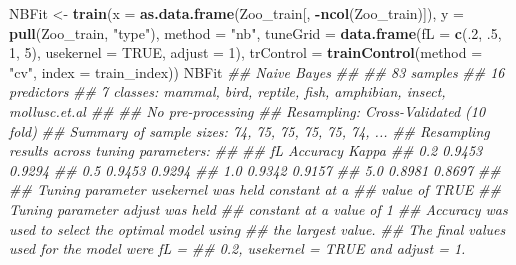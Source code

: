 \documentclass[
  notitlepage]{book}
\newenvironment{Shaded}{\begin{snugshade}}{\end{snugshade}}
\newcommand{\CommentTok}[1]{\textcolor[rgb]{0.56,0.35,0.01}{\textit{#1}}}
\newcommand{\DataTypeTok}[1]{\textcolor[rgb]{0.13,0.29,0.53}{#1}}
\newcommand{\DecValTok}[1]{\textcolor[rgb]{0.00,0.00,0.81}{#1}}
\newcommand{\FloatTok}[1]{\textcolor[rgb]{0.00,0.00,0.81}{#1}}
\newcommand{\KeywordTok}[1]{\textcolor[rgb]{0.13,0.29,0.53}{\textbf{#1}}}
\newcommand{\NormalTok}[1]{#1}
\newcommand{\OperatorTok}[1]{\textcolor[rgb]{0.81,0.36,0.00}{\textbf{#1}}}
\newcommand{\OtherTok}[1]{\textcolor[rgb]{0.56,0.35,0.01}{#1}}
\newcommand{\StringTok}[1]{\textcolor[rgb]{0.31,0.60,0.02}{#1}}
\begin{document}
\begin{Shaded}
\begin{Highlighting}[]
\NormalTok{NBFit \textless{}{-}}\StringTok{ }\KeywordTok{train}\NormalTok{(}\DataTypeTok{x =} \KeywordTok{as.data.frame}\NormalTok{(Zoo\_train[, }\OperatorTok{{-}}\KeywordTok{ncol}\NormalTok{(Zoo\_train)]), }
               \DataTypeTok{y =} \KeywordTok{pull}\NormalTok{(Zoo\_train, }\StringTok{"type"}\NormalTok{),}
               \DataTypeTok{method =} \StringTok{"nb"}\NormalTok{,}
               \DataTypeTok{tuneGrid =} \KeywordTok{data.frame}\NormalTok{(}\DataTypeTok{fL =} \KeywordTok{c}\NormalTok{(.}\DecValTok{2}\NormalTok{, }\FloatTok{.5}\NormalTok{, }\DecValTok{1}\NormalTok{, }\DecValTok{5}\NormalTok{), }
                                     \DataTypeTok{usekernel =} \OtherTok{TRUE}\NormalTok{, }\DataTypeTok{adjust =} \DecValTok{1}\NormalTok{),}
               \DataTypeTok{trControl =} \KeywordTok{trainControl}\NormalTok{(}\DataTypeTok{method =} \StringTok{"cv"}\NormalTok{, }
                                        \DataTypeTok{index =}\NormalTok{ train\_index))}
\NormalTok{NBFit}
\CommentTok{\#\# Naive Bayes }
\CommentTok{\#\# }
\CommentTok{\#\# 83 samples}
\CommentTok{\#\# 16 predictors}
\CommentTok{\#\#  7 classes: \textquotesingle{}mammal\textquotesingle{}, \textquotesingle{}bird\textquotesingle{}, \textquotesingle{}reptile\textquotesingle{}, \textquotesingle{}fish\textquotesingle{}, \textquotesingle{}amphibian\textquotesingle{}, \textquotesingle{}insect\textquotesingle{}, \textquotesingle{}mollusc.et.al\textquotesingle{} }
\CommentTok{\#\# }
\CommentTok{\#\# No pre{-}processing}
\CommentTok{\#\# Resampling: Cross{-}Validated (10 fold) }
\CommentTok{\#\# Summary of sample sizes: 74, 75, 75, 75, 75, 74, ... }
\CommentTok{\#\# Resampling results across tuning parameters:}
\CommentTok{\#\# }
\CommentTok{\#\#   fL   Accuracy  Kappa }
\CommentTok{\#\#   0.2  0.9453    0.9294}
\CommentTok{\#\#   0.5  0.9453    0.9294}
\CommentTok{\#\#   1.0  0.9342    0.9157}
\CommentTok{\#\#   5.0  0.8981    0.8697}
\CommentTok{\#\# }
\CommentTok{\#\# Tuning parameter \textquotesingle{}usekernel\textquotesingle{} was held constant at a}
\CommentTok{\#\#  value of TRUE}
\CommentTok{\#\# Tuning parameter \textquotesingle{}adjust\textquotesingle{} was held}
\CommentTok{\#\#  constant at a value of 1}
\CommentTok{\#\# Accuracy was used to select the optimal model using}
\CommentTok{\#\#  the largest value.}
\CommentTok{\#\# The final values used for the model were fL =}
\CommentTok{\#\#  0.2, usekernel = TRUE and adjust = 1.}
\end{Highlighting}
\end{Shaded}
\end{document}
